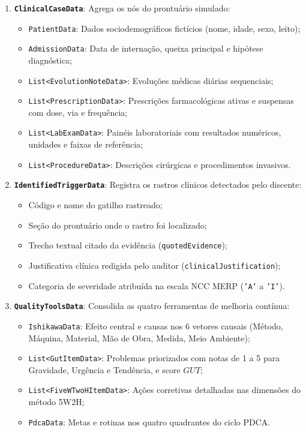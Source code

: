\begin{enumerate}
    \item \textbf{\texttt{ClinicalCaseData}}: Agrega os nós do prontuário simulado:
    \begin{itemize}
        \item \texttt{PatientData}: Dados sociodemográficos fictícios (nome, idade, sexo, leito);
        \item \texttt{AdmissionData}: Data de internação, queixa principal e hipótese diagnóstica;
        \item \texttt{List<EvolutionNoteData>}: Evoluções médicas diárias sequenciais;
        \item \texttt{List<PrescriptionData>}: Prescrições farmacológicas ativas e suspensas com dose, via e frequência;
        \item \texttt{List<LabExamData>}: Painéis laboratoriais com resultados numéricos, unidades e faixas de referência;
        \item \texttt{List<ProcedureData>}: Descrições cirúrgicas e procedimentos invasivos.
    \end{itemize}

    \item \textbf{\texttt{IdentifiedTriggerData}}: Registra os rastros clínicos detectados pelo discente:
    \begin{itemize}
        \item Código e nome do gatilho rastreado;
        \item Seção do prontuário onde o rastro foi localizado;
        \item Trecho textual citado da evidência (\texttt{quotedEvidence});
        \item Justificativa clínica redigida pelo auditor (\texttt{clinicalJustification});
        \item Categoria de severidade atribuída na escala NCC MERP (\texttt{'A'} a \texttt{'I'}).
    \end{itemize}

    \item \textbf{\texttt{QualityToolsData}}: Consolida as quatro ferramentas de melhoria contínua:
    \begin{itemize}
        \item \texttt{IshikawaData}: Efeito central e causas nos 6 vetores causais (Método, Máquina, Material, Mão de Obra, Medida, Meio Ambiente);
        \item \texttt{List<GutItemData>}: Problemas priorizados com notas de 1 a 5 para Gravidade, Urgência e Tendência, e score $GUT$;
        \item \texttt{List<FiveWTwoHItemData>}: Ações corretivas detalhadas nas dimensões do método 5W2H;
        \item \texttt{PdcaData}: Metas e rotinas nos quatro quadrantes do ciclo PDCA.
    \end{itemize}
\end{enumerate}

